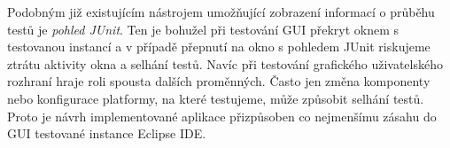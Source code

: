 Podobným již existujícím nástrojem umožňující zobrazení informací o průběhu testů je \emph{pohled JUnit}. Ten je bohužel při testování GUI překryt oknem s testovanou instancí a v případě přepnutí na okno s pohledem JUnit riskujeme ztrátu aktivity okna a selhání testů. Navíc při testování grafického uživatelského rozhraní hraje roli spousta dalších proměnných. Často jen změna komponenty nebo konfigurace platformy, na které testujeme, může způsobit selhání testů. Proto je návrh implementované aplikace přizpůsoben co nejmenšímu zásahu do GUI testované instance Eclipse IDE.
